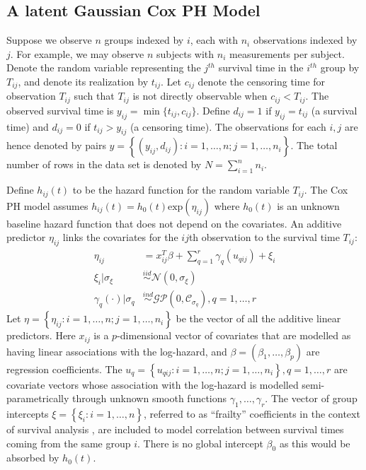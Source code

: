 \documentclass[ba]{imsart}
\begin{document}
\subsection{A latent Gaussian Cox PH Model}

Suppose we observe $n$ groups indexed by $i$, each with $n_{i}$ observations indexed by $j$. For example, we may observe $n$ subjects with $n_{i}$ measurements per subject. Denote the random variable representing the $j^{th}$ survival time in the $i^{th}$ group by $T_{ij}$, and denote its realization by $t_{ij}$. Let $c_{ij}$ denote the censoring time for observation $T_{ij}$ such that $T_{ij}$ is not directly observable when $c_{ij} < T_{ij}$. The observed survival time is $y_{ij} = \min\{t_{ij},c_{ij}\}$. Define $d_{ij} = 1$ if $y_{ij} = t_{ij}$ (a survival time) and $d_{ij} = 0$ if $t_{ij} > y_{ij}$ (a censoring time). The observations for each $i,j$ are hence denoted by pairs $y =  \left\{(y_{ij},d_{ij}): i = 1,\ldots,n; j = 1,\ldots,n_{i} \right\}$. The total number of rows in the data set is denoted by $N = \sum_{i=1}^{n}n_{i}$.

Define $h_{ij}(t)$ to be the hazard function for the random variable $T_{ij}$. The Cox PH model assumes $h_{ij}(t) = h_0(t)\text{exp}(\eta_{ij})$ where $h_0(t)$ is an unknown baseline hazard function that does not depend on the covariates. An additive predictor $\eta_{ij}$ links the covariates for the $ij$th observation to the survival time $T_{ij}$:
\begin{equation}\begin{aligned}\label{eqn:eta}
\eta_{ij} &=x_{ij}^{T}\beta+\sum_{q=1}^{r} \gamma_q(u_{qij}) +\xi_{i} \\
\xi_i | \sigma_{\xi} &\overset{iid}{\sim} \mathcal{N}(0,\sigma_{\xi}) \\
\gamma_{q}(\cdot)|\sigma_{q} &\overset{ind}{\sim} \mathcal{GP}\left(0,\mathcal{C}_{\sigma_q}\right), q = 1,\ldots,r
\end{aligned}\end{equation}
Let $\eta = \left\{ \eta_{ij}: i = 1,\ldots,n; j = 1,\ldots,n_{i}\right\}$ be the vector of all the additive linear predictors. Here $x_{ij}$ is a $p$-dimensional vector of covariates that are modelled as having linear associations with the log-hazard, and $\beta = (\beta_{1},\ldots,\beta_{p})$ are regression coefficients. The $u_{q} = \left\{u_{qij}: i = 1,\ldots,n; j = 1,\ldots,n_{i} \right\}, q = 1,\ldots,r$ are covariate vectors whose association with the log-hazard is modelled semi-parametrically through unknown smooth functions $\gamma_1,\ldots,\gamma_r$. The vector of group intercepts $\xi = \left\{ \xi_{i}: i=1,\ldots,n\right\}$, referred to as ``frailty'' coefficients in the context of survival analysis \citep{frailty}, are included to model correlation between survival times coming from the same group $i$. There is no global intercept $\beta_{0}$ as this would be absorbed by $h_{0}(t)$.
\end{document}

